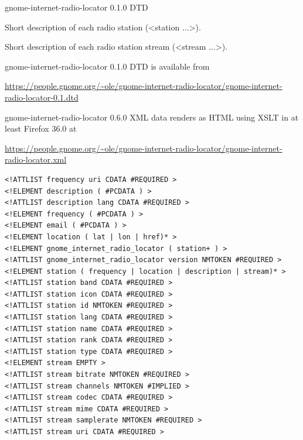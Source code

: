 \documentclass[20pt,landscape]{foils}
\begin{document}
\begin{list1}
\item gnome-internet-radio-locator 0.1.0 DTD
\item Short description of each radio station (<station ...>).
\item Short description of each radio station stream (<stream ...>).
\item gnome-internet-radio-locator 0.1.0 DTD is available from \begin{tiny}\url{https://people.gnome.org/~ole/gnome-internet-radio-locator/gnome-internet-radio-locator-0.1.dtd}\end{tiny}
\item gnome-internet-radio-locator 0.6.0 XML data renders as HTML using XSLT in at least Firefox 36.0 at \begin{tiny}\url{https://people.gnome.org/~ole/gnome-internet-radio-locator/gnome-internet-radio-locator.xml}\end{tiny}
\end{list1}



\begin{tiny}
\begin{verbatim}
<!ATTLIST frequency uri CDATA #REQUIRED >
<!ELEMENT description ( #PCDATA ) >
<!ATTLIST description lang CDATA #REQUIRED >
<!ELEMENT frequency ( #PCDATA ) >
<!ELEMENT email ( #PCDATA ) >
<!ELEMENT location ( lat | lon | href)* >
<!ELEMENT gnome_internet_radio_locator ( station+ ) >
<!ATTLIST gnome_internet_radio_locator version NMTOKEN #REQUIRED >
<!ELEMENT station ( frequency | location | description | stream)* >
<!ATTLIST station band CDATA #REQUIRED >
<!ATTLIST station icon CDATA #REQUIRED >
<!ATTLIST station id NMTOKEN #REQUIRED >
<!ATTLIST station lang CDATA #REQUIRED >
<!ATTLIST station name CDATA #REQUIRED >
<!ATTLIST station rank CDATA #REQUIRED >
<!ATTLIST station type CDATA #REQUIRED >
<!ELEMENT stream EMPTY >
<!ATTLIST stream bitrate NMTOKEN #REQUIRED >
<!ATTLIST stream channels NMTOKEN #IMPLIED >
<!ATTLIST stream codec CDATA #REQUIRED >
<!ATTLIST stream mime CDATA #REQUIRED >
<!ATTLIST stream samplerate NMTOKEN #REQUIRED >
<!ATTLIST stream uri CDATA #REQUIRED >
\end{verbatim}
\end{tiny}

\end{document}
